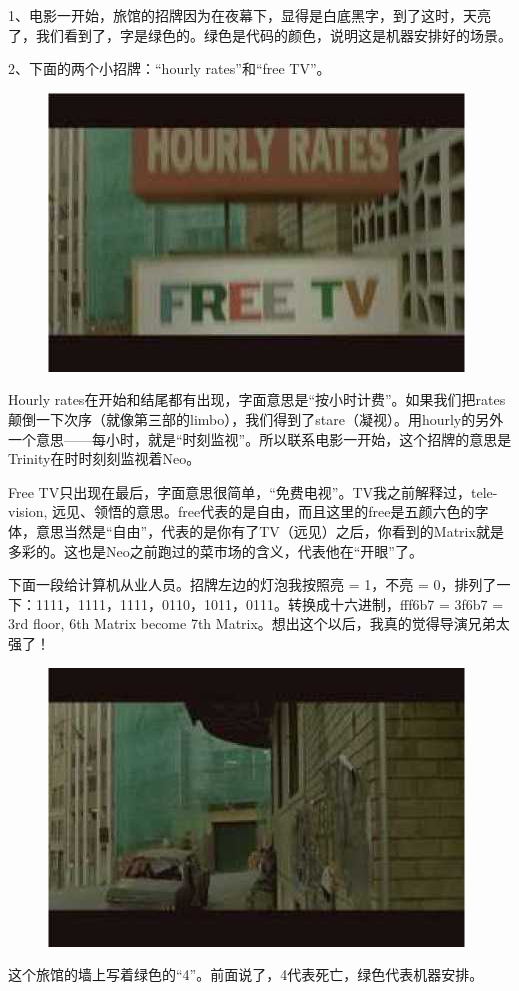 \documentclass[UTF8]{ctexart}
\begin{document}
1、电影一开始，旅馆的招牌因为在夜幕下，显得是白底黑字，到了这时，天亮了，我们看到了，字是绿色的。绿色是代码的颜色，说明这是机器安排好的场景。

2、下面的两个小招牌：“hourly rates”和“free TV”。

\begin{figure}[!h]
\centering
\includegraphics[width=0.5\linewidth]{fig/read_Matrix-86}
\end{figure}

Hourly rates在开始和结尾都有出现，字面意思是“按小时计费”。如果我们把rates颠倒一下次序（就像第三部的limbo），我们得到了stare（凝视）。用hourly的另外一个意思——每小时，就是“时刻监视”。所以联系电影一开始，这个招牌的意思是Trinity在时时刻刻监视着Neo。

Free TV只出现在最后，字面意思很简单，“免费电视”。TV我之前解释过，tele-vision, 远见、领悟的意思。free代表的是自由，而且这里的free是五颜六色的字体，意思当然是“自由”，代表的是你有了TV（远见）之后，你看到的Matrix就是多彩的。这也是Neo之前跑过的菜市场的含义，代表他在“开眼”了。

下面一段给计算机从业人员。招牌左边的灯泡我按照亮 = 1，不亮 = 0，排列了一下：1111，1111，1111，0110，1011，0111。转换成十六进制，fff6b7 = 3f6b7 = 3rd floor, 6th Matrix become 7th Matrix。想出这个以后，我真的觉得导演兄弟太强了！

\begin{figure}[htb]
\centering
\includegraphics[width=0.5\linewidth]{fig/read_Matrix-87}
\end{figure}

这个旅馆的墙上写着绿色的“4”。前面说了，4代表死亡，绿色代表机器安排。
\end{document}
